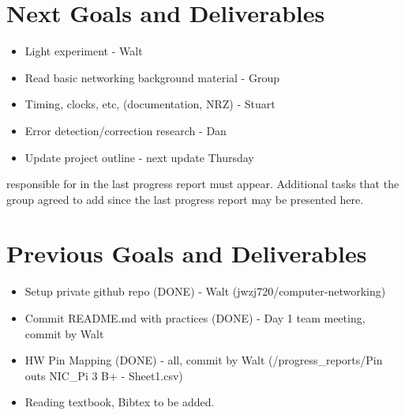 \documentclass{article}
\begin{document}
\section*{Next Goals and Deliverables}
\begin{itemize}
\item Light experiment - Walt
\item Read basic networking background material - Group
\item Timing, clocks, etc, (documentation, NRZ) - Stuart
\item Error detection/correction research - Dan
\item Update project outline - next update Thursday
\end{itemize}
responsible for in the last progress report must appear. Additional tasks that the
group agreed to add since the last progress report may be presented here.
\section*{Previous Goals and Deliverables}
\begin{itemize}
\item Setup private github repo (DONE) - Walt (jwzj720/computer-networking)
\item Commit README.md with practices (DONE) - Day 1 team meeting, commit by Walt
\item HW Pin Mapping (DONE) - all, commit by Walt (/progress_reports/Pin outs NIC_Pi 3 B+ - Sheet1.csv)
\item Reading textbook, Bibtex to be added.
\end{itemize}
\end{document}
